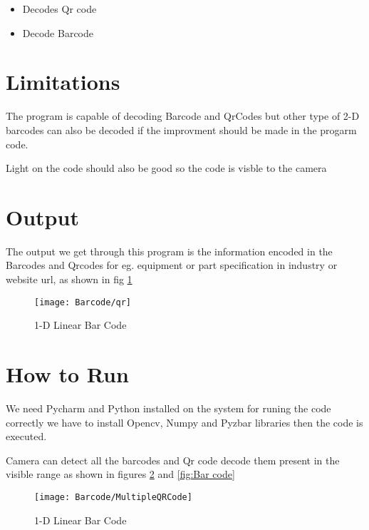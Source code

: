 \begin{itemize}
    \item Decodes Qr code 
    \item Decode Barcode
\end{itemize}

\section{Limitations}

The program is capable of decoding Barcode and QrCodes but other type of 2-D barcodes can also be decoded if the improvment should be made in the progarm code.

Light on the code should also be good so the code is visble to the camera 

\section{Output}

The output we get through this program is the information encoded in the Barcodes and Qrcodes for eg. equipment or part specification in industry or website url, as shown in fig \ref{fig:qr}

\begin{figure}
    \begin{center}
        \texttt{[image: Barcode/qr]}
        \caption{1-D Linear Bar Code}\label{fig:qr}
    \end{center}
\end{figure}


\section{How to Run}

We need Pycharm and Python installed on the system for runing the code correctly we have to install Opencv, Numpy and Pyzbar libraries then the code is executed.


Camera can detect all the barcodes and Qr code decode them present in the visible range as shown in figures \ref{fig:Multiple QR code} and \ref{fig:Bar code}


\begin{figure}
    \begin{center}
        \texttt{[image: Barcode/MultipleQRCode]}
        \caption{1-D Linear Bar Code}\label{fig:Multiple QR code}
    \end{center}
\end{figure}


